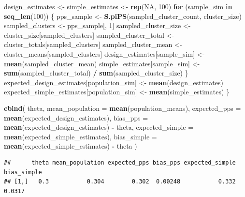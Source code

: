 \documentclass[
  english,
  12pt,
]{book}
\newenvironment{Shaded}{\begin{snugshade}}{\end{snugshade}}
\newcommand{\AttributeTok}[1]{\textcolor[rgb]{0.13,0.29,0.53}{#1}}
\newcommand{\ConstantTok}[1]{\textcolor[rgb]{0.56,0.35,0.01}{#1}}
\newcommand{\ControlFlowTok}[1]{\textcolor[rgb]{0.13,0.29,0.53}{\textbf{#1}}}
\newcommand{\DecValTok}[1]{\textcolor[rgb]{0.00,0.00,0.81}{#1}}
\newcommand{\FunctionTok}[1]{\textcolor[rgb]{0.13,0.29,0.53}{\textbf{#1}}}
\newcommand{\NormalTok}[1]{#1}
\newcommand{\OtherTok}[1]{\textcolor[rgb]{0.56,0.35,0.01}{#1}}
\newcommand{\SpecialCharTok}[1]{\textcolor[rgb]{0.81,0.36,0.00}{\textbf{#1}}}
\begin{document}
\begin{Shaded}
\begin{Highlighting}[]
\NormalTok{  design\_estimates }\OtherTok{\textless{}{-}}\NormalTok{ simple\_estimates }\OtherTok{\textless{}{-}} \FunctionTok{rep}\NormalTok{(}\ConstantTok{NA}\NormalTok{, }\DecValTok{100}\NormalTok{)}
  \ControlFlowTok{for}\NormalTok{ (sample\_sim }\ControlFlowTok{in} \FunctionTok{seq\_len}\NormalTok{(}\DecValTok{100}\NormalTok{)) \{}
\NormalTok{    pps\_sample }\OtherTok{\textless{}{-}} \FunctionTok{S.piPS}\NormalTok{(sampled\_cluster\_count, cluster\_size)}
\NormalTok{    sampled\_clusters }\OtherTok{\textless{}{-}}\NormalTok{ pps\_sample[, }\DecValTok{1}\NormalTok{]}
\NormalTok{    sampled\_cluster\_size }\OtherTok{\textless{}{-}}\NormalTok{ cluster\_size[sampled\_clusters]}
\NormalTok{    sampled\_cluster\_total }\OtherTok{\textless{}{-}}\NormalTok{ cluster\_totals[sampled\_clusters]}
\NormalTok{    sampled\_cluster\_mean }\OtherTok{\textless{}{-}}\NormalTok{ cluster\_means[sampled\_clusters]}
\NormalTok{    design\_estimates[sample\_sim] }\OtherTok{\textless{}{-}} \FunctionTok{mean}\NormalTok{(sampled\_cluster\_mean)}
\NormalTok{    simple\_estimates[sample\_sim] }\OtherTok{\textless{}{-}}
      \FunctionTok{sum}\NormalTok{(sampled\_cluster\_total) }\SpecialCharTok{/} \FunctionTok{sum}\NormalTok{(sampled\_cluster\_size)}
\NormalTok{  \}}
\NormalTok{  expected\_design\_estimates[population\_sim] }\OtherTok{\textless{}{-}} \FunctionTok{mean}\NormalTok{(design\_estimates)}
\NormalTok{  expected\_simple\_estimates[population\_sim] }\OtherTok{\textless{}{-}} \FunctionTok{mean}\NormalTok{(simple\_estimates)}
\NormalTok{\}}

\FunctionTok{cbind}\NormalTok{(}
\NormalTok{  theta,}
  \AttributeTok{mean\_population =} \FunctionTok{mean}\NormalTok{(population\_means),}
  \AttributeTok{expected\_pps =} \FunctionTok{mean}\NormalTok{(expected\_design\_estimates),}
  \AttributeTok{bias\_pps =} \FunctionTok{mean}\NormalTok{(expected\_design\_estimates) }\SpecialCharTok{{-}}\NormalTok{ theta,}
  \AttributeTok{expected\_simple =} \FunctionTok{mean}\NormalTok{(expected\_simple\_estimates),}
  \AttributeTok{bias\_simple =} \FunctionTok{mean}\NormalTok{(expected\_simple\_estimates) }\SpecialCharTok{{-}}\NormalTok{ theta}
\NormalTok{)}
\end{Highlighting}
\end{Shaded}

\begin{verbatim}
##      theta mean_population expected_pps bias_pps expected_simple bias_simple
## [1,]   0.3           0.304        0.302  0.00248           0.332      0.0317
\end{verbatim}
\end{document}

